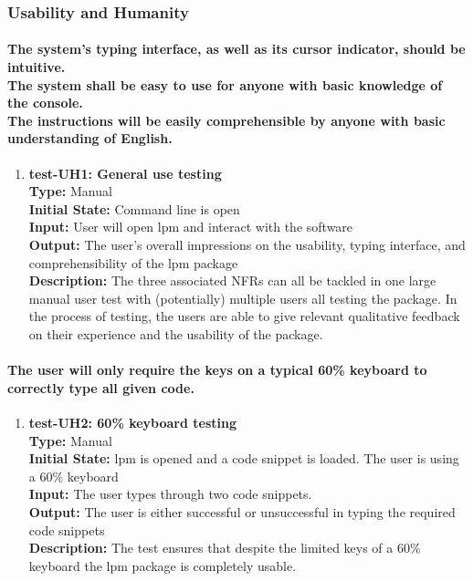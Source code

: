 \documentclass[12pt, titlepage]{article}
\begin{document}
\subsubsection{Usability and Humanity}
\paragraph{The system’s typing interface, as well as its cursor indicator, should be intuitive.\\
The system shall be easy to use for anyone with basic knowledge of the console.\\
The instructions will be easily comprehensible by anyone with basic understanding of English.\\}
\begin{enumerate}
\item{\textbf{test-UH1: General use testing}\\}
    \textbf{Type:} Manual\\
    \textbf{Initial State:}  Command line is open\\
    \textbf{Input:} User will open lpm and interact with the software\\
    \textbf{Output:} The user's overall impressions on the usability, typing interface, and comprehensibility of the lpm package \\
    \textbf{Description: } The three associated NFRs can all be tackled in one large manual user test with (potentially) multiple users all testing the package. In the process of testing, the users are able to give relevant qualitative feedback on their experience and the usability of the package. \\
\end{enumerate}

\paragraph{The user will only require the keys on a typical 60\% keyboard to correctly type
all given code.}
\begin{enumerate}
    \item{\textbf{test-UH2: 60\% keyboard testing}\\}
    \textbf{Type:} Manual\\
    \textbf{Initial State:}  lpm is opened and a code snippet is loaded. The user is using a 60\% keyboard\\
    \textbf{Input:} The user types through two code snippets. \\
    \textbf{Output:} The user is either successful or unsuccessful in typing the required code snippets\\
    \textbf{Description:} The test ensures that despite the limited keys of a 60\% keyboard the lpm package is completely usable. \\
\end{enumerate}
\end{document}
